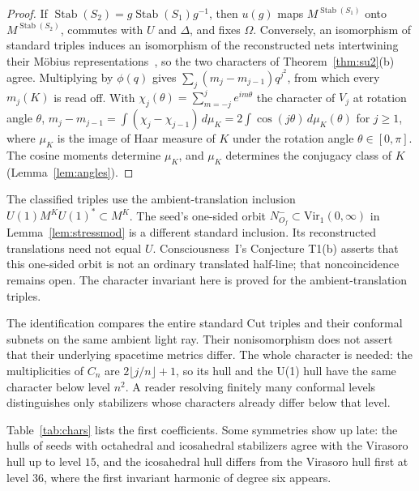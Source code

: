 \documentclass[12pt]{article}
\theoremstyle{definition}
\theoremstyle{remark}
\newcommand{\Stab}{\operatorname{Stab}}
\begin{document}
\begin{proof}
If \(\Stab(S_2)=g\Stab(S_1)g^{-1}\), then \(u(g)\) maps \(M^{\Stab(S_1)}\) onto
\(M^{\Stab(S_2)}\), commutes with \(U\) and \(\Delta\), and fixes \(\Omega\). Conversely,
an isomorphism of standard triples induces an isomorphism of the reconstructed nets
intertwining their M\"obius representations~\cite{GLW,BGL}, so the two characters of
Theorem~\ref{thm:su2}(b) agree. Multiplying by \(\phi(q)\) gives
\(\sum_j(m_j-m_{j-1})q^{j^2}\), from which every \(m_j(K)\) is read off. With
\(\chi_j(\theta)=\sum_{m=-j}^je^{im\theta}\) the character of \(V_j\) at rotation angle
\(\theta\), \(m_j-m_{j-1}=\int(\chi_j-\chi_{j-1})\,d\mu_K=2\int\cos(j\theta)\,d\mu_K(\theta)\)
for \(j\ge1\), where \(\mu_K\) is the image of Haar measure of \(K\) under the rotation
angle \(\theta\in[0,\pi]\). The cosine moments determine \(\mu_K\), and \(\mu_K\)
determines the conjugacy class of \(K\) (Lemma~\ref{lem:angles}).
\end{proof}

The classified triples use the ambient-translation inclusion
$U(1)M^KU(1)^*\subset M^K$. The seed's one-sided orbit
$N^-_{O_f}\subset\mathrm{Vir}_1(0,\infty)$ in
Lemma~\ref{lem:stressmod} is a different standard inclusion.
Its reconstructed translations need not equal $U$.
Consciousness~I's Conjecture T1(b) asserts that this one-sided orbit
is not an ordinary translated half-line; that noncoincidence remains
open. The character invariant here is
proved for the ambient-translation triples.

The identification compares the entire standard Cut triples and their conformal subnets
on the same ambient light ray. Their nonisomorphism does not assert that their underlying
spacetime metrics differ.
The whole character is needed: the multiplicities of \(C_n\) are
\(2\lfloor j/n\rfloor+1\), so its hull and the U(1) hull have the same character below
level \(n^2\). A reader resolving finitely many conformal levels distinguishes only
stabilizers whose characters already differ below that level.

Table~\ref{tab:chars} lists the first coefficients. Some symmetries show up late: the
hulls of seeds with octahedral and icosahedral stabilizers agree with the Virasoro hull
up to level \(15\), and the icosahedral hull differs from the Virasoro hull first at
level \(36\), where the first invariant harmonic of degree six appears.
\end{document}
